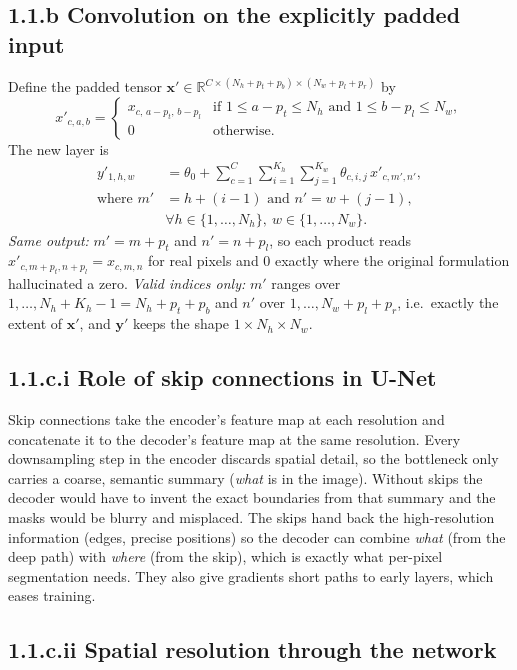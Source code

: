 \documentclass[11pt,a4paper]{article}
\newcommand{\x}{\mathbf{x}}
\begin{document}
\subsection*{1.1.b Convolution on the explicitly padded input}

Define the padded tensor $\x'\in\mathbb{R}^{C\times(N_h+p_t+p_b)\times(N_w+p_l+p_r)}$ by
\[
x'_{c,a,b} =
\begin{cases}
x_{c,\,a-p_t,\,b-p_l} & \text{if } 1\le a-p_t\le N_h \text{ and } 1\le b-p_l\le N_w,\\
0 & \text{otherwise.}
\end{cases}
\]
The new layer is
\begin{align}
y'_{1,h,w} &= \theta_0 + \sum_{c=1}^{C}\sum_{i=1}^{K_h}\sum_{j=1}^{K_w}\theta_{c,i,j}\,x'_{c,m',n'}, \\
\text{where } m' &= h+(i-1) \text{ and } n' = w+(j-1), \\
&\forall h\in\{1,\dots,N_h\},\ w\in\{1,\dots,N_w\}.
\end{align}
\emph{Same output:} $m' = m+p_t$ and $n'=n+p_l$, so each product reads $x'_{c,m+p_t,n+p_l}=x_{c,m,n}$ for real pixels and $0$ exactly where the original formulation hallucinated a zero. \emph{Valid indices only:} $m'$ ranges over $1,\dots,N_h+K_h-1 = N_h+p_t+p_b$ and $n'$ over $1,\dots,N_w+p_l+p_r$, i.e.\ exactly the extent of $\x'$, and $\mathbf{y}'$ keeps the shape $1\times N_h\times N_w$.

\subsection*{1.1.c.i Role of skip connections in U-Net}

Skip connections take the encoder's feature map at each resolution and concatenate it to the decoder's feature map at the same resolution. Every downsampling step in the encoder discards spatial detail, so the bottleneck only carries a coarse, semantic summary (\emph{what} is in the image). Without skips the decoder would have to invent the exact boundaries from that summary and the masks would be blurry and misplaced. The skips hand back the high-resolution information (edges, precise positions) so the decoder can combine \emph{what} (from the deep path) with \emph{where} (from the skip), which is exactly what per-pixel segmentation needs. They also give gradients short paths to early layers, which eases training.

\subsection*{1.1.c.ii Spatial resolution through the network}
\end{document}
